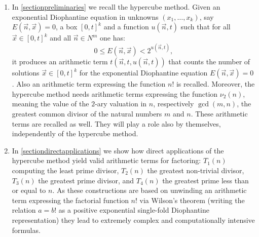 \documentclass[10pt]{article}
\theoremstyle{plain}
\begin{document}
\begin{enumerate}
    \item In \cref{sectionpreliminaries} we recall the hypercube method. Given an exponential Diophantine equation in unknowns $(x_1, \dots,x_k)$, say $E(\vec n, \vec x) = 0$, a box $[0,t]^k$ and a function $u(\vec n, t)$ such that for all $\vec x \in [0,t]^k$ and all $\vec n \in N^m$ one has:
    $$0 \leq E(\vec n, \vec x) < 2^{u(\vec n, t)},$$
    it produces an arithmetic term $t(\vec n, t, u(\vec n, t))$ that counts the number of solutions $\vec x \in [0,t]^k$ for the exponential Diophantine equation $E(\vec n, \vec x) = 0$. Also  an arithmetic term expressing the function $n!$ is recalled. Moreover, the hypercube method needs arithmetic terms expressing the function $\nu_2(n)$, meaning the value of the $2$-ary valuation in $n$, respectively $\gcd(m,n)$, the greatest common divisor of the natural numbers $m$ and $n$. These arithmetic terms are recalled as well. They will play a role also by themselves, independently of the hypercube method.
    \item In \cref{sectiondirectapplications} we show how direct applications of the hypercube method yield valid arithmetic terms for factoring: $T_1(n)$ computing the least prime divisor, $T_2(n)$ the greatest non-trivial divisor, $T_3(n)$ the greatest prime divisor, and $T_4(n)$ the greatest prime less than or equal to $n$. As these constructions are based on unwinding an arithmetic term expressing the factorial function $n!$ via Wilson's theorem (writing the relation $a = b!$ as a positive exponential single-fold Diophantine representation) they lead to extremely complex and computationally intensive formulas.


\end{enumerate}
\end{document}
